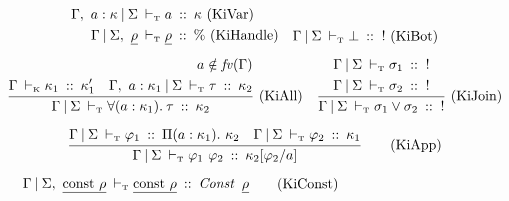 \begin{figure}[ht!]

\begin{center}
\fbox{ $\kiJudge{\Gamma}{\Sigma}{\varphi}{\kappa}$ } \\
\end{center}
\vspace{-1em}
\begin{gather*}
	\begin{aligned}
			\kiJudge{\Gamma, \ a : \kappa}{\Sigma& }{a}{\kappa}
			\trm{\ (KiVar)}
		\\
			\kiJudge{\Gamma}{\Sigma, \ \un{\rho}& }{\un{\rho}} {\%} 
			\trm{\ (KiHandle)}
	\end{aligned}
	\quad
	\begin{aligned}
		\\
		\ruleAL	{KiBot}
			{ \kiJudge{\Gamma}{\Sigma}
				{ \bot }
				{ \ ! }
			}
	\end{aligned}
\\[1ex]
	\ruleIL	{KiAll}
		{ \begin{aligned}
		  \\
 		  \ksJudge
			{\Gamma}{\kappa_1}{\kappa_1'}
		  \end{aligned}
		  \quad
	  	  \begin{aligned}
          		a \notin \ifv(\Gamma)
	  		\\
	  		\kiJudge
	  		{\Gamma, \ a : \kappa_1}{\Sigma}
			{\tau}{\kappa_2}
  	  	  \end{aligned}
		}
		{ \kiJudge
			{\Gamma}{\Sigma}
			{ \tyForall{a}{\kappa_1}{\tau} }
			{ \kappa_2 }
		}
	\quad
	\ruleIL	{KiJoin}
		{ \begin{aligned}
		  	\kiJudge{\Gamma}{\Sigma}
				{ \sigma_1 }
				{ \ ! }
		  \\
		  \kiJudge{\Gamma}{\Sigma}
		  	{ \sigma_2 }
			{ \ ! }
		  \end{aligned}
		}
		{ \kiJudge{\Gamma}{\Sigma}
			{ \sigma_1 \lor \sigma_2 }
			{ \ ! }
		}
\\[1ex]
	\ruleI	{KiApp}
		{ \kiJudge{\Gamma}{\Sigma}
			{ \varphi_1 }
			{ \Pi (a : \kappa_1) . \ \kappa_2 }
		  \quad
		  \kiJudge{\Gamma}{\Sigma}
		  	{ \varphi_2 }
			{ \kappa_1 }
	 	}
		{ \kiJudge{\Gamma}{\Sigma}
			{ \varphi_1 \ \varphi_2 }
			{ \kappa_2 [\varphi_2 / a] }
		}
\\[1ex]
	\ruleA	{KiConst}
		{ \hspace{-10.6em}
		  	\kiJudge{\Gamma}{\Sigma, \ \un{ \trm{const} \ \rho}}
			{ \un {\trm{const} \ \rho} }
			{ \iConst \ \un{\rho} }
		}
\\[1ex]

\end{gather*}
\end{figure}
